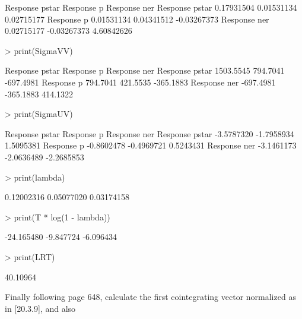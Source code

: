 \begin{Schunk}
\begin{Soutput}
               Response pstar  Response p Response ner
Response pstar     0.17931504  0.01531134   0.02715177
Response p         0.01531134  0.04341512  -0.03267373
Response ner       0.02715177 -0.03267373   4.60842626
\end{Soutput}
\begin{Sinput}
> print(SigmaVV)
\end{Sinput}
\begin{Soutput}
               Response pstar Response p Response ner
Response pstar      1503.5545   794.7041    -697.4981
Response p           794.7041   421.5535    -365.1883
Response ner        -697.4981  -365.1883     414.1322
\end{Soutput}
\begin{Sinput}
> print(SigmaUV)
\end{Sinput}
\begin{Soutput}
               Response pstar Response p Response ner
Response pstar     -3.5787320 -1.7958934    1.5095381
Response p         -0.8602478 -0.4969721    0.5243431
Response ner       -3.1461173 -2.0636489   -2.2685853
\end{Soutput}
\begin{Sinput}
> print(lambda)
\end{Sinput}
\begin{Soutput}
[1] 0.12002316 0.05077020 0.03174158
\end{Soutput}
\begin{Sinput}
> print(T * log(1 - lambda))
\end{Sinput}
\begin{Soutput}
[1] -24.165480  -9.847724  -6.096434
\end{Soutput}
\begin{Sinput}
> print(LRT)
\end{Sinput}
\begin{Soutput}
[1] 40.10964
\end{Soutput}
\end{Schunk}
Finally following page 648, calculate the first cointegrating vector normalized as in [20.3.9], and also
